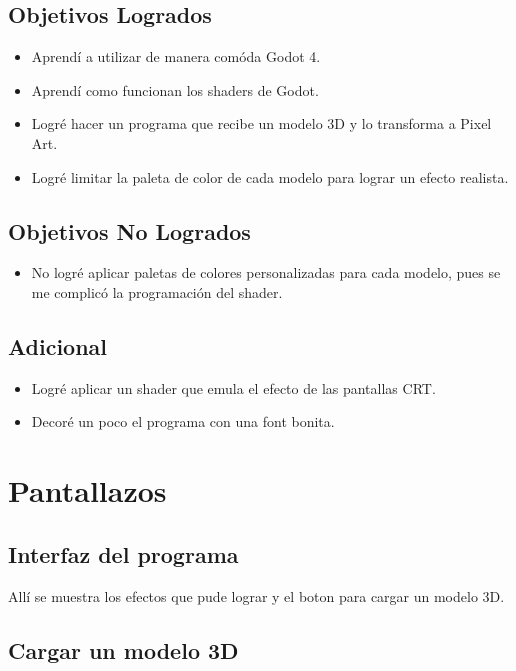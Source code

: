 \subsection{Objetivos Logrados}
	\begin{itemize}
        \item Aprendí a utilizar de manera comóda Godot 4.
        \item Aprendí como funcionan los shaders de Godot.
        \item Logré hacer un programa que recibe un modelo 3D y lo transforma a Pixel Art.
        \item Logré limitar la paleta de color de cada modelo para lograr un efecto realista.
	\end{itemize}

\subsection{Objetivos No Logrados}
	\begin{itemize}
        \item No logré aplicar paletas de colores personalizadas para cada modelo, pues se me complicó la programación del shader.
	\end{itemize}

\subsection{Adicional}
	\begin{itemize}
        \item Logré aplicar un shader que emula el efecto de las pantallas CRT.
        \item Decoré un poco el programa con una font bonita.
	\end{itemize}
\clearpage
\section{Pantallazos}

\subsection{Interfaz del programa}

Allí se muestra los efectos que pude lograr y el boton para cargar un modelo 3D.

\subsection{Cargar un modelo 3D}

